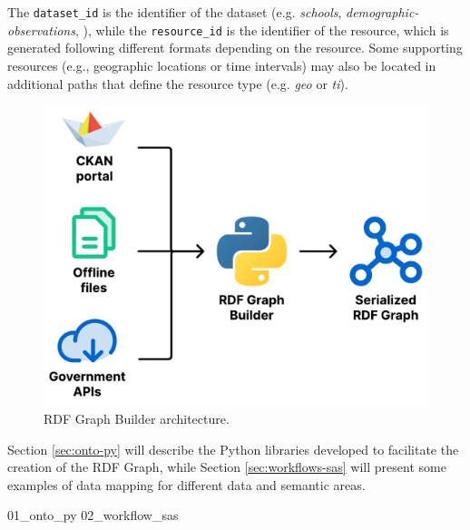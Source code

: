 The \verb#dataset_id# is the identifier of the dataset (e.g. \textit{schools}, \textit{demographic-observations}, \etc), while the \verb#resource_id# is the identifier of the resource, which is generated following different formats depending on the resource. Some supporting resources (e.g., geographic locations or time intervals) may also be located in additional paths that define the resource type (e.g. \textit{geo} or \textit{ti}).

\begin{figure}[!ht]
  \centering
  \includegraphics[width=0.6\columnwidth]{images/ontoim/rdf-graph-builder}
  \caption{\ac{RDF} Graph Builder architecture.}
  \label{fig:rdf-builder-architecture}
\end{figure}

Section \ref{sec:onto-py} will describe the Python libraries developed to facilitate the creation of the \ac{RDF} Graph, while Section \ref{sec:workflows-sas} will present some examples of data mapping for different data and semantic areas.

{01_onto_py}%
{02_workflow_sas}%